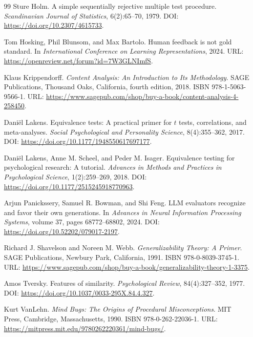 \begin{thebibliography}{99}
Sture Holm.
\newblock A simple sequentially rejective multiple test procedure.
\newblock \emph{Scandinavian Journal of Statistics}, 6(2):65--70, 1979.
\newblock DOI: \url{https://doi.org/10.2307/4615733}.

Tom Hosking, Phil Blunsom, and Max Bartolo.
\newblock Human feedback is not gold standard.
\newblock In \emph{International Conference on Learning Representations}, 2024.
\newblock URL: \url{https://openreview.net/forum?id=7W3GLNImfS}.

Klaus Krippendorff.
\newblock \emph{Content Analysis: An Introduction to Its Methodology}.
\newblock SAGE Publications, Thousand Oaks, California, fourth edition, 2018. ISBN 978-1-5063-9566-1.
\newblock URL: \url{https://www.sagepub.com/shop/buy-a-book/content-analysis-4-258450}.

Dani\"el Lakens.
\newblock Equivalence tests: A practical primer for $t$ tests, correlations, and meta-analyses.
\newblock \emph{Social Psychological and Personality Science}, 8(4):355--362, 2017.
\newblock DOI: \url{https://doi.org/10.1177/1948550617697177}.

Dani\"el Lakens, Anne M. Scheel, and Peder M. Isager.
\newblock Equivalence testing for psychological research: A tutorial.
\newblock \emph{Advances in Methods and Practices in Psychological Science}, 1(2):259--269, 2018.
\newblock DOI: \url{https://doi.org/10.1177/2515245918770963}.

Arjun Panickssery, Samuel R. Bowman, and Shi Feng.
\newblock LLM evaluators recognize and favor their own generations.
\newblock In \emph{Advances in Neural Information Processing Systems}, volume 37, pages 68772--68802, 2024.
\newblock DOI: \url{https://doi.org/10.52202/079017-2197}.

Richard J. Shavelson and Noreen M. Webb.
\newblock \emph{Generalizability Theory: A Primer}.
\newblock SAGE Publications, Newbury Park, California, 1991. ISBN 978-0-8039-3745-1.
\newblock URL: \url{https://www.sagepub.com/shop/buy-a-book/generalizability-theory-1-3375}.

Amos Tversky.
\newblock Features of similarity.
\newblock \emph{Psychological Review}, 84(4):327--352, 1977.
\newblock DOI: \url{https://doi.org/10.1037/0033-295X.84.4.327}.

Kurt VanLehn.
\newblock \emph{Mind Bugs: The Origins of Procedural Misconceptions}.
\newblock MIT Press, Cambridge, Massachusetts, 1990. ISBN 978-0-262-22036-1.
\newblock URL: \url{https://mitpress.mit.edu/9780262220361/mind-bugs/}.

\end{thebibliography}

